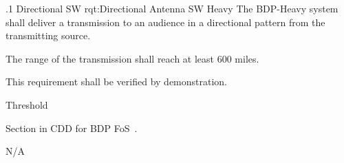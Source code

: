 
\NRQMTT
{\RqtNumberBase.1}
{Directional SW}
{rqt:Directional Antenna SW Heavy}
{The BDP-Heavy system shall deliver a \SW transmission to an audience in a directional pattern from the transmitting source.}%
{
	\item The range of the \SW transmission shall reach at least 600 miles.
}
{This requirement shall be verified by demonstration.}
{
	\item [Phase 1] Threshold
}
{
\item [5.1.2] Section in CDD for BDP FoS~\cite{ref__BDP_FOS_CDD}.	
} 
{
	\item N/A
}

